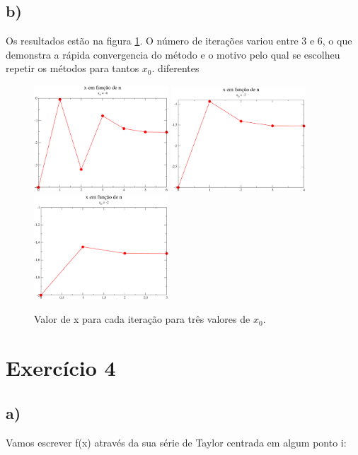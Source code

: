 \documentclass[a4wide]{report}
\begin{document}
\subsection*{b)}

Os resultados estão na figura \ref{iteracao}. O número de iterações variou entre 3 e 6, o que demonstra a rápida convergencia do método e o motivo pelo qual se escolheu repetir os métodos para tantos $x_{0}$. diferentes
\begin{figure}[h]
\centering
\includegraphics[width=0.447\textwidth]{4.pdf}
\includegraphics[width=0.447\textwidth]{3.pdf}
\includegraphics[width=0.447\textwidth]{2.pdf}
\caption{Valor de x para cada iteração para três valores de $x_{0}$.}
\label{iteracao}
\end{figure}




\section*{Exercício 4}
\subsection*{a)}
Vamos escrever f(x) através da sua série de Taylor centrada em algum ponto i:
\end{document}
